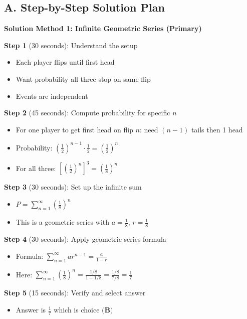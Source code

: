 \documentclass[11pt]{article}
\begin{document}
\begin{roadmapbox}
\subsection*{A. Step-by-Step Solution Plan}

\textbf{Solution Method 1: Infinite Geometric Series (Primary)}

\textbf{Step 1} (30 seconds): Understand the setup
\begin{itemize}
    \item Each player flips until first head
    \item Want probability all three stop on same flip
    \item Events are independent
\end{itemize}

\textbf{Step 2} (45 seconds): Compute probability for specific $n$
\begin{itemize}
    \item For one player to get first head on flip $n$: need $(n-1)$ tails then 1 head
    \item Probability: $\left(\frac{1}{2}\right)^{n-1} \cdot \frac{1}{2} = \left(\frac{1}{2}\right)^n$
    \item For all three: $\left[\left(\frac{1}{2}\right)^n\right]^3 = \left(\frac{1}{8}\right)^n$
\end{itemize}

\textbf{Step 3} (30 seconds): Set up the infinite sum
\begin{itemize}
    \item $P = \sum_{n=1}^{\infty} \left(\frac{1}{8}\right)^n$
    \item This is a geometric series with $a = \frac{1}{8}$, $r = \frac{1}{8}$
\end{itemize}

\textbf{Step 4} (30 seconds): Apply geometric series formula
\begin{itemize}
    \item Formula: $\sum_{n=1}^{\infty} ar^{n-1} = \frac{a}{1-r}$
    \item Here: $\sum_{n=1}^{\infty} \left(\frac{1}{8}\right)^n = \frac{1/8}{1-1/8} = \frac{1/8}{7/8} = \frac{1}{7}$
\end{itemize}

\textbf{Step 5} (15 seconds): Verify and select answer
\begin{itemize}
    \item Answer is $\boxed{\frac{1}{7}}$ which is choice $\textbf{(B)}$
\end{itemize}


\end{roadmapbox}
\end{document}
